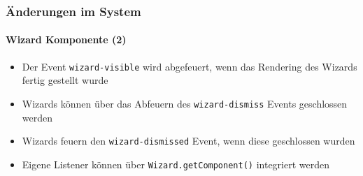 \begin{frame}[fragile]
	\frametitle{Änderungen im System}
	\framesubtitle{Wizard Komponente (2)}

	\lstset{basicstyle=\tiny\ttfamily}

	\begin{itemize}

		\item Der Event \texttt{wizard-visible} wird abgefeuert, wenn das Rendering des Wizards fertig gestellt wurde

		\item Wizards können über das Abfeuern des \texttt{wizard-dismiss} Events geschlossen werden

		\item Wizards feuern den \texttt{wizard-dismissed} Event, wenn diese geschlossen wurden

		\item Eigene Listener können über \texttt{Wizard.getComponent()} integriert werden

	\end{itemize}

\end{frame}

